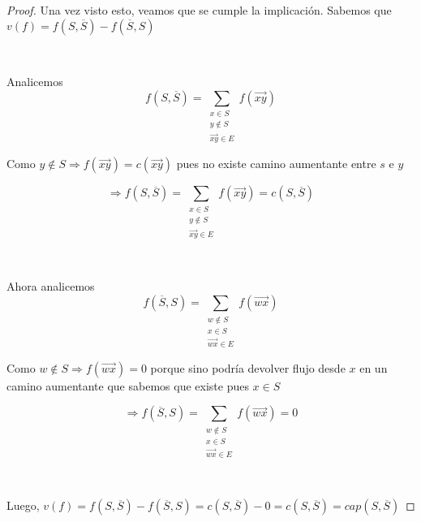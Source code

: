 \documentclass[11pt]{article}
\begin{document}
\begin{proof}
Una vez visto esto, veamos que se cumple la implicación. Sabemos que $v(f) = f(S, \overline{S}) - f(\overline{S}, S)$ \par
\

Analicemos \[f(S, \overline{S}) = \sum_{\substack{x \in S \\ y \notin S \\ \overrightarrow{xy} \in E}} f(\overrightarrow{xy}) \]\par
Como $y \notin S \Rightarrow f(\overrightarrow{xy}) = c(\overrightarrow{xy})$ pues no existe camino aumentante entre $s$ e $y$\par
\[ \Rightarrow f(S, \overline{S}) = \sum_{\substack{x \in S \\ y \notin S \\ \overrightarrow{xy} \in E}} f(\overrightarrow{xy})  = c(S, \overline{S})\]\par
\

Ahora analicemos  \[f(\overline{S}, S) = \sum_{\substack{w \notin S \\ x \in S \\ \overrightarrow{wx} \in E}} f(\overrightarrow{wx}) \]\par
Como $w \notin S \Rightarrow  f(\overrightarrow{wx}) = 0$ porque sino podría devolver flujo desde $x$ en un camino aumentante que sabemos que existe pues $x \in S$\par
\[ \Rightarrow f(\overline{S}, S) = \sum_{\substack{w \notin S \\ x \in S \\ \overrightarrow{wx} \in E}} f(\overrightarrow{wx}) = 0 \]\par
\

Luego, $v(f) = f(S, \overline{S}) - f(\overline{S}, S) = c(S, \overline{S}) - 0 = c(S, \overline{S}) = cap(S, \overline{S}) $  
\end{proof}
\end{document}
